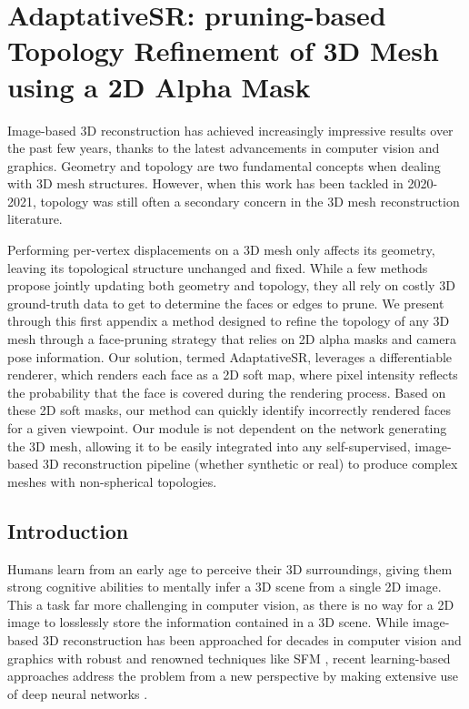 \chapter{AdaptativeSR: pruning-based Topology Refinement of 3D Mesh using a 2D Alpha Mask
}
\label{chapter:appendix-adaptativeSR}

{}



Image-based 3D reconstruction has achieved increasingly impressive results over the past few years, thanks to the latest advancements in computer vision and graphics. Geometry and topology are two fundamental concepts when dealing with 3D mesh structures. However, when this work has been tackled in 2020-2021, topology was still often a secondary concern in the 3D mesh reconstruction literature. 

Performing per-vertex displacements on a 3D mesh only affects its geometry, leaving its topological structure unchanged and fixed. While a few methods propose jointly updating both geometry and topology, they all rely on costly 3D ground-truth data to get to determine the faces or edges to prune. We present through this first appendix a method designed to refine the topology of any 3D mesh through a face-pruning strategy that relies on 2D alpha masks and camera pose information. Our solution, termed AdaptativeSR, leverages a differentiable renderer, which renders each face as a 2D soft map, where pixel intensity reflects the probability that the face is covered during the rendering process. Based on these 2D soft masks, our method can quickly identify incorrectly rendered faces for a given viewpoint. Our module is not dependent on the network generating the 3D mesh, allowing it to be easily integrated into any self-supervised, image-based 3D reconstruction pipeline (whether synthetic or real) to produce complex meshes with non-spherical topologies.

\section{Introduction}
\label{appendix:adaptativesr-intro}

Humans learn from an early age to perceive their 3D surroundings, giving them strong cognitive abilities to mentally infer a 3D scene from a single 2D image. This a task far more challenging in computer vision, as there is no way for a 2D image to losslessly store the information contained in a 3D scene. While image-based 3D reconstruction has been approached for decades in computer vision and graphics with robust and renowned techniques like \ac{SFM} \citep{longuet1981computer}, recent learning-based approaches address the problem from a new perspective by making extensive use of deep neural networks
\citep{kanazawa2018learning,deng2019accurate,saito2020pifuhd}.

